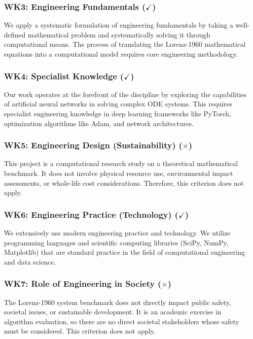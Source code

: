 \subsubsection{WK3: Engineering Fundamentals ($\checkmark$)}

We apply a systematic formulation of engineering fundamentals by taking a well-defined mathematical problem and systematically solving it through computational means. The process of translating the Lorenz-1960 mathematical equations into a computational model requires core engineering methodology.

\subsubsection{WK4: Specialist Knowledge ($\checkmark$)}

Our work operates at the forefront of the discipline by exploring the capabilities of artificial neural networks in solving complex ODE systems. This requires specialist engineering knowledge in deep learning frameworks like PyTorch, optimization algorithms like Adam, and network architectures.

\subsubsection{WK5: Engineering Design (Sustainability) ($\times$)}

This project is a computational research study on a theoretical mathematical benchmark. It does not involve physical resource use, environmental impact assessments, or whole-life cost considerations. Therefore, this criterion does not apply.

\subsubsection{WK6: Engineering Practice (Technology) ($\checkmark$)}

We extensively use modern engineering practice and technology. We utilize programming languages and scientific computing libraries (SciPy, NumPy, Matplotlib) that are standard practice in the field of computational engineering and data science.

\subsubsection{WK7: Role of Engineering in Society ($\times$)}

The Lorenz-1960 system benchmark does not directly impact public safety, societal issues, or sustainable development. It is an academic exercise in algorithm evaluation, so there are no direct societal stakeholders whose safety must be considered. This criterion does not apply.

